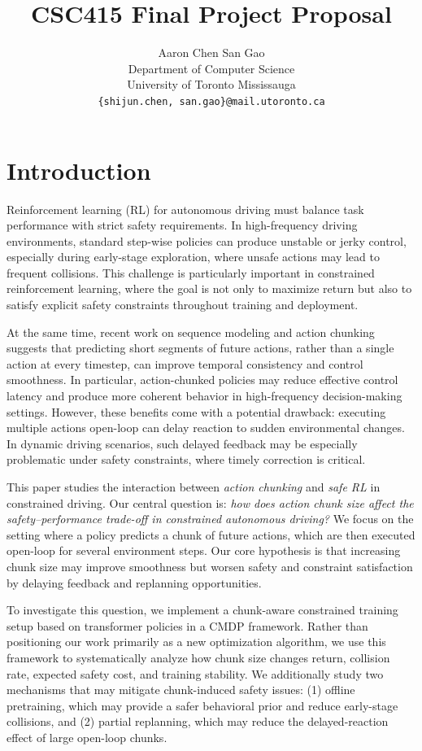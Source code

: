 \documentclass{article}
\title{CSC415 Final Project Proposal}
\author{
  Aaron Chen \quad San Gao \\
  Department of Computer Science \\
  University of Toronto Mississauga \\
  \texttt{\{shijun.chen, san.gao\}@mail.utoronto.ca}
}
\begin{document}
\maketitle
\section{Introduction}

Reinforcement learning (RL) for autonomous driving must balance task performance with strict safety requirements. In high-frequency driving environments, standard step-wise policies can produce unstable or jerky control, especially during early-stage exploration, where unsafe actions may lead to frequent collisions. This challenge is particularly important in constrained reinforcement learning, where the goal is not only to maximize return but also to satisfy explicit safety constraints throughout training and deployment.

At the same time, recent work on sequence modeling and action chunking suggests that predicting short segments of future actions, rather than a single action at every timestep, can improve temporal consistency and control smoothness. In particular, action-chunked policies may reduce effective control latency and produce more coherent behavior in high-frequency decision-making settings. However, these benefits come with a potential drawback: executing multiple actions open-loop can delay reaction to sudden environmental changes. In dynamic driving scenarios, such delayed feedback may be especially problematic under safety constraints, where timely correction is critical.

This paper studies the interaction between \emph{action chunking} and \emph{safe RL} in constrained driving. Our central question is: \emph{how does action chunk size affect the safety--performance trade-off in constrained autonomous driving?} We focus on the setting where a policy predicts a chunk of future actions, which are then executed open-loop for several environment steps. Our core hypothesis is that increasing chunk size may improve smoothness but worsen safety and constraint satisfaction by delaying feedback and replanning opportunities.

To investigate this question, we implement a chunk-aware constrained training setup based on transformer policies in a CMDP framework. Rather than positioning our work primarily as a new optimization algorithm, we use this framework to systematically analyze how chunk size changes return, collision rate, expected safety cost, and training stability. We additionally study two mechanisms that may mitigate chunk-induced safety issues: (1) offline pretraining, which may provide a safer behavioral prior and reduce early-stage collisions, and (2) partial replanning, which may reduce the delayed-reaction effect of large open-loop chunks.
\end{document}
